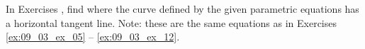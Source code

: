 {\noindent In Exercises}
{, find where the curve defined by the given parametric equations has a horizontal tangent line. Note: these are the same equations as in Exercises \ref{ex:09_03_ex_05} -- \ref{ex:09_03_ex_12}.
}
